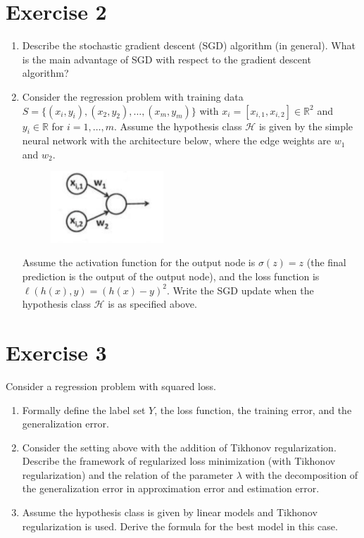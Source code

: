 \documentclass[a4paper,11pt,oneside]{book}
\begin{document}
\section{Exercise 2}
    \begin{enumerate}
        \item Describe the stochastic gradient descent (SGD) algorithm (in general). What is the main advantage of SGD with respect to the gradient descent algorithm?
        \item Consider the regression problem with training data $S = \{(x_i, y_i), (x_2, y_2), \dots, (x_m, y_m)\}$ with $x_i = [x_{i,1}, x_{i,2}] \in \mathbb{R}^2$ and $y_i \in \mathbb{R}$ for $i=1, \dots, m$.
            Assume the hypothesis class $\mathcal{H}$ is given by the simple neural network with the architecture below, where the edge weights are $w_1$ and $w_2$.

            \begin{figure}[H]
                \centering
                \includegraphics[width=0.4\textwidth,height=0.6\textheight,keepaspectratio]{images/2_16_Feb_2022.png}
            \end{figure}

            Assume the activation function for the output node is $\sigma(z) = z$ (the final prediction is the output of the output node), and the loss function is $\ell(h(x), y) = (h(x) - y)^2$.
            Write the SGD update when the hypothesis class $\mathcal{H}$ is as specified above.
    \end{enumerate}

\section{Exercise 3}
    Consider a regression problem with squared loss.
    \begin{enumerate}
        \item Formally define the label set $Y$, the loss function, the training error, and the generalization error.
        \item Consider the setting above with the addition of Tikhonov regularization. Describe the framework of regularized loss minimization (with Tikhonov regularization) and the relation of the parameter $\lambda$ with the decomposition of the generalization error in approximation error and estimation error.
        \item Assume the hypothesis class is given by linear models and Tikhonov regularization is used. Derive the formula for the best model in this case.
    \end{enumerate}
\end{document}
